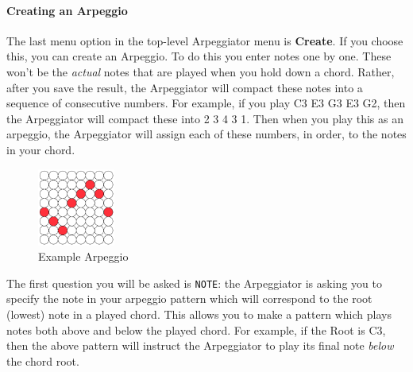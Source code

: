 \documentclass{article}
\begin{document}
\paragraph{Creating an Arpeggio}

The last menu option in the top-level Arpeggiator menu is {\bf Create}.  If you choose this, you can create an Arpeggio.  To do this you enter notes one by one.  These won't be the {\it actual} notes that are played when you hold down a chord.  Rather, after you save the result, the Arpeggiator will compact these notes into a sequence of consecutive numbers.  For example, if you play C3 E3 G3 E3 G2, then the Arpeggiator will compact these into 2 3 4 3 1.  Then when you play this as an arpeggio, the Arpeggiator will assign each of these numbers, in order, to the notes in your chord. 

\begin{figure}
\begin{center}
\vspace{-2em}
\includegraphics[width=1in]{arpeggioexample.pdf}\\
Example Arpeggio\\[2em]
\end{center}
\vspace{-2em}
\label{arpeggioediting}
\end{figure}

The first question you will be asked is \texttt{NOTE}: the Arpeggiator is asking you to specify the note in your arpeggio pattern which will correspond to the root (lowest) note in a played chord.  This allows you to make a pattern which plays notes both above and below the played chord.  For example, if the Root is C3, then the above pattern will instruct the Arpeggiator to play its final note {\it below} the chord root.
\end{document}
